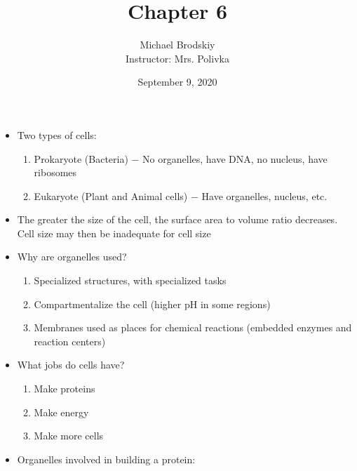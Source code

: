 \documentclass[12pt]{article}
\title{Chapter 6}
\date{September 9, 2020}
\author{Michael Brodskiy\\ \small Instructor: Mrs. Polivka}
\begin{document}
\maketitle

\begin{itemize}

  \item Two types of cells:

    \begin{enumerate}

      \item Prokaryote (Bacteria)  $-$ No organelles, have DNA, no nucleus, have ribosomes

      \item Eukaryote (Plant and Animal cells) $-$ Have organelles, nucleus, etc.

    \end{enumerate}

  \item The greater the size of the cell, the surface area to volume ratio decreases. Cell size may then be inadequate for cell size

  \item Why are organelles used?

    \begin{enumerate}

      \item Specialized structures, with specialized tasks

      \item Compartmentalize the cell (higher pH in some regions)

      \item Membranes used as places for chemical reactions (embedded enzymes and reaction centers)

    \end{enumerate}

  \item What jobs do cells have?

    \begin{enumerate}

     \item Make proteins

     \item Make energy

     \item Make more cells

    \end{enumerate}

  \item Organelles involved in building a protein:


\end{itemize}
\end{document}
